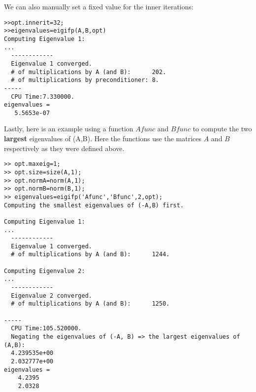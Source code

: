 \documentclass[acmtoms]{acmtrans2m}
\begin{document}
We can also  
manually set a fixed value for the inner iterations:
\begin{verbatim}
>>opt.innerit=32;
>>eigenvalues=eigifp(A,B,opt)
Computing Eigenvalue 1:
...
  ------------
  Eigenvalue 1 converged.
  # of multiplications by A (and B):      202. 
  # of multiplications by preconditioner: 8.
-----
  CPU Time:7.330000.
eigenvalues =
   5.5653e-07
\end{verbatim}


Lastly, here is an example using a function $Afunc$ and $Bfunc$ to compute the two {\bf largest} eigenvalues of (A,B). Here
the functions use the matrices $A$ and $B$ respectively as they were defined above. 
\begin{verbatim}
>> opt.maxeig=1;
>> opt.size=size(A,1);
>> opt.normA=norm(A,1);
>> opt.normB=norm(B,1);
>> eigenvalues=eigifp('Afunc','Bfunc',2,opt);
Computing the smallest eigenvalues of (-A,B) first.
 
Computing Eigenvalue 1:
...
  ------------
  Eigenvalue 1 converged.
  # of multiplications by A (and B):      1244.
 
Computing Eigenvalue 2:
...
  ------------
  Eigenvalue 2 converged.
  # of multiplications by A (and B):      1250.
 
-----
  CPU Time:105.520000.
  Negating the eigenvalues of (-A, B) => the largest eigenvalues of (A,B):
  4.239535e+00
  2.032777e+00
eigenvalues =
    4.2395
    2.0328
\end{verbatim}
\end{document}
